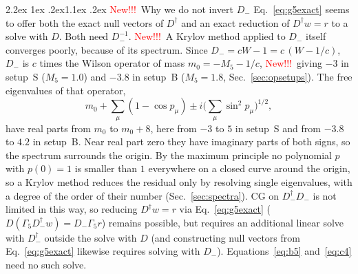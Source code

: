 \documentclass[11pt,a4paper]{article}
\makeatletter
\newif\ifshownew \shownewtrue
\DeclareRobustCommand\New{\ifshownew\textcolor{red}{New!!!}\ \else\ignorespaces\fi}
\renewcommand\subsection{\@startsection{subsection}{2}{\z@}%
  {2.2ex \@plus 1ex \@minus .2ex}{1.1ex \@plus .2ex}%
  {\centering\normalfont\small\bfseries}}
\numberwithin{equation}{section}
\newcommand{\dg}{^{\dagger}}
\newcommand{\Gfive}{\Gamma_5}
\newif\ifresults
\makeatother
\begin{document}
\subsection{\New Why we do not invert \texorpdfstring{$D_-$}{D-}}
\label{sec:g5fail}
Eq.~\eqref{eq:g5exact} seems to offer both the exact null vectors of $D\dg$ and an exact
reduction of $D\dg w=r$ to a solve with $D$. Both need $D_-^{-1}$. \New A Krylov method applied to $D_-$ itself converges poorly,
because of its spectrum. Since $D_-=cW-1=c\,(W-1/c)$, $D_-$ is $c$ times the
Wilson operator of mass $m_0=-M_5-1/c$, \New giving $-3$ in setup~S ($M_5=1.0$) and $-3.8$ in setup~B ($M_5=1.8$, Sec.~\ref{sec:opsetups}). The free
eigenvalues of that operator,
\begin{equation}
m_0+\sum_\mu(1-\cos p_\mu)\pm i\Big(\sum_\mu\sin^2p_\mu\Big)^{1/2},
\end{equation}
have real parts from $m_0$ to $m_0+8$, here from $-3$ to $5$ in setup~S and from $-3.8$ to $4.2$ in
setup~B. Near real part zero they have
imaginary parts of both signs, so the spectrum surrounds the origin. By the maximum principle
no polynomial $p$ with $p(0)=1$ is smaller than $1$ everywhere on a closed curve around the
origin, so a Krylov method reduces the residual only by resolving single eigenvalues, with a
degree of the order of their number (Sec.~\ref{sec:spectra}). CG on $D_-\dg D_-$ is not limited in
this way, so reducing $D\dg w=r$ via Eq.~\eqref{eq:g5exact} ($D(\Gfive D_-\dg w)=D_-\Gfive r$)
remains possible, but requires an additional linear solve with $D_-\dg$ outside the solve with $D$
(and constructing null vectors from Eq.~\eqref{eq:g5exact} likewise requires solving with $D_-$).
Equations~\eqref{eq:b5} and~\eqref{eq:c4} need no such solve.

\ifresults
\end{document}
